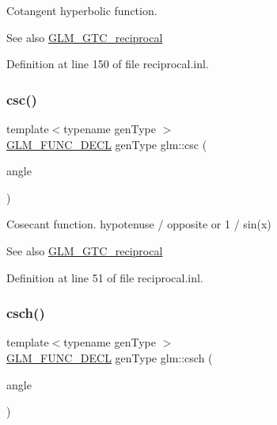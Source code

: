 Cotangent hyperbolic function.

\begin{DoxySeeAlso}{See also}
\hyperlink{group__gtc__reciprocal}{G\+L\+M\+\_\+\+G\+T\+C\+\_\+reciprocal} 
\end{DoxySeeAlso}


Definition at line 150 of file reciprocal.\+inl.

\mbox{\label{group__gtc__reciprocal_ga5df75de99f63e854087a06f538907b2c}} 
\subsubsection{\texorpdfstring{csc()}{csc()}}
{\footnotesize\ttfamily template$<$typename gen\+Type $>$ \\
\hyperlink{setup_8hpp_ab2d052de21a70539923e9bcbf6e83a51}{G\+L\+M\+\_\+\+F\+U\+N\+C\+\_\+\+D\+E\+CL} gen\+Type glm\+::csc (\begin{DoxyParamCaption}\item[{gen\+Type const \&}]{angle }\end{DoxyParamCaption})}

Cosecant function. hypotenuse / opposite or 1 / sin(x)

\begin{DoxySeeAlso}{See also}
\hyperlink{group__gtc__reciprocal}{G\+L\+M\+\_\+\+G\+T\+C\+\_\+reciprocal} 
\end{DoxySeeAlso}


Definition at line 51 of file reciprocal.\+inl.

\mbox{\label{group__gtc__reciprocal_ga00404a9cdf62023792d1d0afedd7f896}} 
\subsubsection{\texorpdfstring{csch()}{csch()}}
{\footnotesize\ttfamily template$<$typename gen\+Type $>$ \\
\hyperlink{setup_8hpp_ab2d052de21a70539923e9bcbf6e83a51}{G\+L\+M\+\_\+\+F\+U\+N\+C\+\_\+\+D\+E\+CL} gen\+Type glm\+::csch (\begin{DoxyParamCaption}\item[{gen\+Type const \&}]{angle }\end{DoxyParamCaption})}

